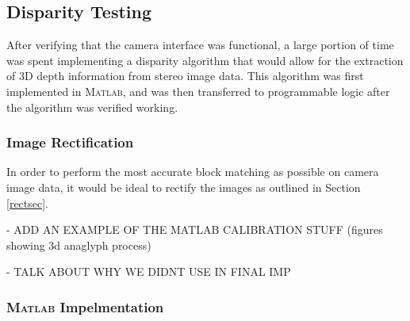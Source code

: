 \subsection{Disparity Testing}
After verifying that the camera interface was functional, a large portion of time was spent implementing a disparity algorithm that would allow for the extraction of 3D depth information from stereo image data. This algorithm was first implemented in \textsc{Matlab}, and was then transferred to programmable logic after the algorithm was verified working. 
\subsubsection{Image Rectification}
In order to perform the most accurate block matching as possible on camera image data, it would be ideal to rectify the images as outlined in Section \ref{rectsec}. 
\par
- ADD AN EXAMPLE OF THE MATLAB CALIBRATION STUFF (figures showing 3d anaglyph process)\par
- TALK ABOUT WHY WE DIDNT USE IN FINAL IMP


\subsubsection{\textsc{Matlab} Impelmentation}


